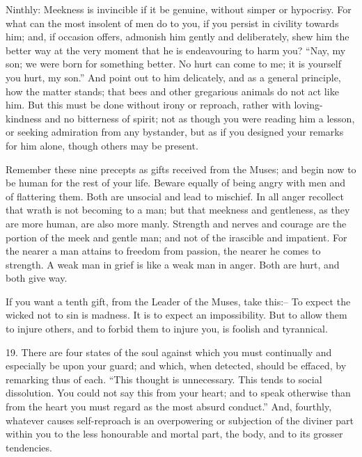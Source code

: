 \documentclass{book}
\begin{document}
Ninthly: Meekness is invincible if it be genuine, without simper or
hypocrisy. For what can the most insolent of men do to you, if you
persist in civility towards him; and, if occasion offers, admonish him
gently and deliberately, shew him the better way at the very moment
that he is endeavouring to harm you? ``Nay, my son; we were born for
something better. No hurt can come to me; it is yourself you hurt, my
son.'' And point out to him delicately, and as a general principle, how
the matter stands; that bees and other gregarious animals do not act
like him. But this must be done without irony or reproach, rather with
loving-kindness and no bitterness of spirit; not as though you were
reading him a lesson, or seeking admiration from any bystander, but as
if you designed your remarks for him alone, though others may be
present.

Remember these nine precepts as gifts received from the Muses; and
begin now to be human for the rest of your life. Beware equally of
being angry with men and of flattering them. Both are unsocial and
lead to mischief. In all anger recollect that wrath is not becoming to
a man; but that meekness and gentleness, as they are more human, are
also more manly. Strength and nerves and courage are the portion of
the meek and gentle man; and not of the irascible and impatient. For
the nearer a man attains to freedom from passion, the nearer he comes
to strength. A weak man in grief is like a weak man in anger. Both are
hurt, and both give way.

If you want a tenth gift, from the Leader of the Muses, take this:--
To expect the wicked not to sin is madness. It is to expect an
impossibility. But to allow them to injure others, and to forbid them
to injure you, is foolish and tyrannical.

19. There are four states of the soul against which you must
continually and especially be upon your guard; and which, when
detected, should be effaced, by remarking thus of each. ``This thought
is unnecessary. This tends to social dissolution. You could not say
this from your heart; and to speak otherwise than from the heart you
must regard as the most absurd conduct.'' And, fourthly, whatever
causes self-reproach is an overpowering or subjection of the diviner
part within you to the less honourable and mortal part, the body, and
to its grosser tendencies.
\end{document}

